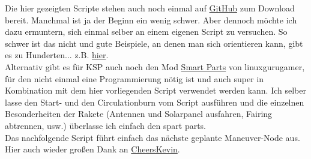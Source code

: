 \documentclass[12pt,paper=A4,numbers=noenddot,bibliography=totoc,listof=totoc,DIV=11,BCOR=1mm]{scrreprt}
\newcommand{\gq}[1]{\glqq #1\grqq} %
\begin{document}
\begin{flushleft}
Die hier gezeigten Scripte stehen auch noch einmal auf \href{https://github.com/Tornado3P9/kOS_Collection}{GitHub} zum Download bereit. Manchmal ist ja der Beginn ein wenig schwer. Aber dennoch möchte ich dazu ermuntern, sich einmal selber an einem eigenen Script zu versuchen. So schwer ist das nicht und gute Beispiele, an denen man sich orientieren kann, gibt es zu Hunderten... z.B. \href{https://kos.fandom.com/wiki/KerboScript}{hier}.\\
Alternativ gibt es für KSP auch noch den Mod \href{https://forum.kerbalspaceprogram.com/index.php?/topic/151340-19x-smart-parts-continued/}{Smart Parts} von \gq{li\-nux\-gu\-ru\-ga\-mer}, für den nicht einmal eine Programmierung nötig ist und auch super in Kombination mit dem hier vorliegenden Script verwendet werden kann. Ich selber lasse den Start- und den Circulationburn vom Script ausführen und die einzelnen Besonderheiten der Rakete (Antennen und Solarpanel ausfahren, Fairing abtrennen, usw.) überlasse ich einfach den \gq{spart parts}.\\
Das nachfolgende Script führt einfach das nächste geplante Maneuver-Node aus. Hier auch wieder großen Dank an \href{https://www.youtube.com/playlist?list=PLb6UbFXBdbCoCm1e65qfDOCdK_qIBtX3D}{CheersKevin}.
\end{flushleft}
\end{document}

